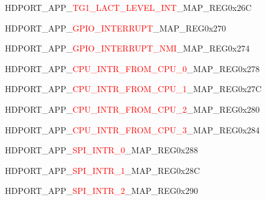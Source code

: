 \vspace{-3em}
\begin{register}{H}{DPORT\_APP\_\textcolor{red}{TG1\_LACT\_LEVEL\_INT}\_MAP\_REG}{0x26C}\label{regdesc:APPTG1LACTLEVELINTMAPREG}
\end{register}
\vspace{-3em}
\begin{register}{H}{DPORT\_APP\_\textcolor{red}{GPIO\_INTERRUPT}\_MAP\_REG}{0x270}\label{regdesc:APPGPIOINTERRUPTMAPREG}
\end{register}
\vspace{-3em}
\begin{register}{H}{DPORT\_APP\_\textcolor{red}{GPIO\_INTERRUPT\_NMI}\_MAP\_REG}{0x274}\label{regdesc:APPGPIOINTERRUPTNMIMAPREG}
\end{register}
\vspace{-3em}
\begin{register}{H}{DPORT\_APP\_\textcolor{red}{CPU\_INTR\_FROM\_CPU\_0}\_MAP\_REG}{0x278}\label{regdesc:APPCPUINTRFROMCPU0MAPREG}
\end{register}
\vspace{-3em}
\begin{register}{H}{DPORT\_APP\_\textcolor{red}{CPU\_INTR\_FROM\_CPU\_1}\_MAP\_REG}{0x27C}\label{regdesc:APPCPUINTRFROMCPU1MAPREG}
\end{register}
\vspace{-3em}
\begin{register}{H}{DPORT\_APP\_\textcolor{red}{CPU\_INTR\_FROM\_CPU\_2}\_MAP\_REG}{0x280}\label{regdesc:APPCPUINTRFROMCPU2MAPREG}
\end{register}
\vspace{-3em}
\begin{register}{H}{DPORT\_APP\_\textcolor{red}{CPU\_INTR\_FROM\_CPU\_3}\_MAP\_REG}{0x284}\label{regdesc:APPCPUINTRFROMCPU3MAPREG}
\end{register}
\vspace{-3em}
\begin{register}{H}{DPORT\_APP\_\textcolor{red}{SPI\_INTR\_0}\_MAP\_REG}{0x288}\label{regdesc:APPSPIINTR0MAPREG}
\end{register}
\vspace{-3em}
\begin{register}{H}{DPORT\_APP\_\textcolor{red}{SPI\_INTR\_1}\_MAP\_REG}{0x28C}\label{regdesc:APPSPIINTR1MAPREG}
\end{register}
\vspace{-3em}
\begin{register}{H}{DPORT\_APP\_\textcolor{red}{SPI\_INTR\_2}\_MAP\_REG}{0x290}\label{regdesc:APPSPIINTR2MAPREG}
\end{register}
